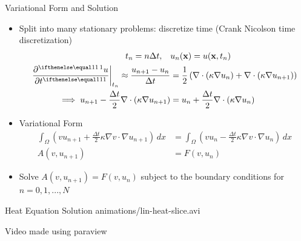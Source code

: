 \documentclass[serif]{beamer}
\begin{document}
\begin{frame}{Variational Form and Solution}
    \begin{itemize}
				\item Split into many stationary problems: discretize time (Crank Nicolson time discretization)
        \[\begin{split}
            t_n = n\Delta t, \quad & u_n(\vec x) = u(\vec x, t_n) \\
            \left.\pder{u}{t}\right|_{t_n} \approx \frac{u_{n+1} - u_n}{\Delta t} & = 
            \frac{1}{2} \left(\nabla \cdot (\kappa \nabla u_n) + \nabla \cdot (\kappa \nabla u_{n+1})\right)\\
            \implies u_{n+1} - \frac{\Delta t}{2} \nabla \cdot (\kappa \nabla u_{n+1}) & = 
            u_n + \frac{\Delta t}{2} \nabla \cdot (\kappa \nabla u_n)
        \end{split}\]

        \item Variational Form
        \[\begin{split}
					\int_\Omega \left(v u_{n+1} + \frac{\Delta t}{2} \kappa \nabla v \cdot \nabla u_{n+1}\right) \, dx & = 
					\int_\Omega \left(vu_n - \frac{\Delta t}{2} \kappa \nabla v \cdot \nabla u_n \right) \, dx \\
					A(v, u_{n+1}) & = F(v, u_n)
				\end{split}\]
        
        \item Solve $A(v, u_{n+1}) = F(v, u_n)$ subject to the boundary conditions
					for $n = 0, 1, ..., N$
    \end{itemize}
\end{frame}

\begin{frame}{Heat Equation Solution}
		\centering
		{animations/lin-heat-slice.avi}

		Video made using paraview
\end{frame}
\end{document}
